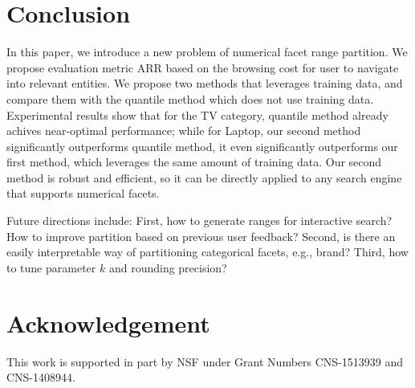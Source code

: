 \section{Conclusion}
\label{sec:discussion}
In this paper, we introduce a new problem of numerical facet range partition. We propose evaluation metric ARR based on the browsing cost for user to navigate into relevant entities. We propose two methods that leverages training data, and compare them with the quantile method which does not use training data. Experimental results show that for the TV category, quantile method already achives near-optimal performance; while for Laptop, our second method significantly outperforms quantile method, it even significantly outperforms our first method, which leverages the same amount of training data. Our second method is robust and efficient, so it can be directly applied to any search engine that supports numerical facets.

Future directions include: First, how to generate ranges for interactive search? How to improve partition based on previous user feedback? Second, is there an easily interpretable way of partitioning categorical facets, e.g., brand? Third, how to tune parameter $k$ and rounding precision? 


 \section*{Acknowledgement}

 This work is supported in part by NSF under Grant Numbers CNS-1513939 and CNS-1408944.